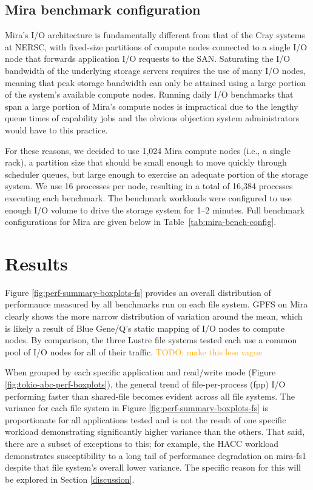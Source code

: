\documentclass[conference,10pt,compsocconf]{IEEEtran}
\newcommand{\todo}[1]{\textcolor{Orange}{TODO: #1}}
\begin{document}
\subsection{Mira benchmark configuration}

Mira's I/O architecture is fundamentally different from that of the Cray
systems at NERSC, with fixed-size partitions of compute nodes connected to
a single I/O node that forwards application I/O requests to the SAN.
Saturating the I/O bandwidth of the underlying storage servers requires the
use of many I/O nodes, meaning that peak storage bandwidth can only be
attained using a large portion of the system's available compute nodes.
Running daily I/O benchmarks that span a large portion of Mira's compute
nodes is impractical due to the lengthy queue times of capability jobs and
the obvious objection system administrators would have to this practice.

For these reasons, we decided to use 1,024 Mira compute nodes (i.e., a single
rack), a partition size that should be small enough to move quickly through
scheduler queues, but large enough to exercise an adequate portion of the
storage system. We use 16 processes per node, resulting in a total of 16,384
processes executing each benchmark. The benchmark workloads were configured
to use enough I/O volume to drive the storage system for 1--2 minutes.
Full benchmark configurations for Mira are given below in
Table~\ref{tab:mira-bench-config}.

\section{Results} \label{results}

Figure \ref{fig:perf-summary-boxplots-fs} provides an overall distribution of
performance measured by all benchmarks run on each file system.  GPFS on Mira
clearly shows the more narrow distribution of variation around the mean, which
is likely a result of Blue Gene/Q's static mapping of I/O nodes to compute
nodes.  By comparison, the three Lustre file systems tested each use a common
pool of I/O nodes for all of their traffic. \todo{make this less vague}

When grouped by each specific application and read/write mode (Figure
\ref{fig:tokio-abc-perf-boxplots}), the general trend of file-per-process (fpp)
I/O performing faster than shared-file becomes evident across all file systems.
The variance for each file system in Figure \ref{fig:perf-summary-boxplots-fs}
is proportionate for all applications tested and is not the result of one
specific workload demonstrating significantly higher variance than the others.  
That said, there are a subset of exceptions to this; for example, the HACC
workload demonstrates susceptibility to a long tail of performance degradation
on mira-fs1 despite that file system's overall lower variance.  The specific
reason for this will be explored in Section \ref{discussion}.
\end{document}
